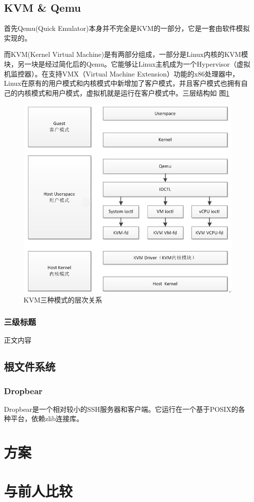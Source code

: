 \documentclass[UTF8,a4paper]{ctexart}
\begin{document}
\subsection{KVM \& Qemu}
首先Qemu(Quick Emulator)本身并不完全是KVM的一部分，它是一套由软件模拟实现的。

而KVM(Kernel Virtual Machine)是有两部分组成，一部分是Linux内核的KVM模块，另一块是经过简化后的Qemu。它能够让Linux主机成为一个Hypervisor（虚拟机监控器）。在支持VMX（Virtual Machine Extension）功能的x86处理器中，Linux在原有的用户模式和内核模式中新增加了客户模式，并且客户模式也拥有自己的内核模式和用户模式，虚拟机就是运行在客户模式中。三层结构如 图\ref{fig:kvm}

\begin{figure}[htbp]
  \centering %
  \includegraphics[width=0.6 \textwidth]{figs/KVM三种模式的层次关系.png}
  \caption{KVM三种模式的层次关系}
  \label{fig:kvm} %
\end{figure}


\subsubsection{三级标题}
正文内容
\subsection{根文件系统}
\subsubsection{Dropbear}
Dropbear是一个相对较小的SSH服务器和客户端。它运行在一个基于POSIX的各种平台，依赖zlib连接库。



\section{方案}


\section{与前人比较}
\end{document}
